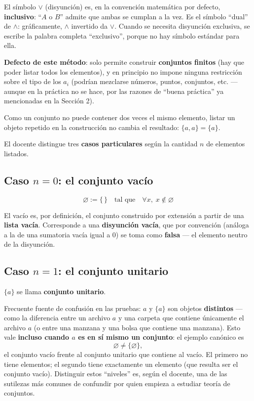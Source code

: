 \documentclass[12pt,a4paper]{article}
\begin{document}
\begin{notebox}
El símbolo $\lor$ (disyunción) es, en la convención matemática por
defecto, \textbf{inclusivo}: ``$A$ o $B$'' admite que ambas se cumplan a
la vez. Es el símbolo ``dual'' de $\wedge$: gráficamente, $\wedge$
invertido da $\lor$. Cuando se necesita disyunción exclusiva, se escribe
la palabra completa ``exclusivo'', porque no hay símbolo estándar para
ella.
\end{notebox}

\textbf{Defecto de este método}: solo permite construir \textbf{conjuntos
finitos} (hay que poder listar todos los elementos), y en principio no
impone ninguna restricción sobre el tipo de los $a_i$ (podrían mezclarse
números, puntos, conjuntos, etc. --- aunque en la práctica no se hace, por
las razones de ``buena práctica'' ya mencionadas en la Sección 2).

Como un conjunto no puede contener dos veces el mismo elemento, listar un
objeto repetido en la construcción no cambia el resultado: $\{a, a\} =
\{a\}$.

El docente distingue tres \textbf{casos particulares} según la cantidad
$n$ de elementos listados.

\subsection{Caso $n=0$: el conjunto vacío}

\begin{keybox}
\[
\boxed{\varnothing := \{\,\} \quad\text{tal que}\quad \forall x,\; x \notin \varnothing}
\]
\end{keybox}

El vacío es, por definición, el conjunto construido por extensión a
partir de una \textbf{lista vacía}. Corresponde a una \textbf{disyunción
vacía}, que por convención (análoga a la de una sumatoria vacía igual a
$0$) se toma como \textbf{falsa} --- el elemento neutro de la disyunción.

\subsection{Caso $n=1$: el conjunto unitario}

$\{a\}$ se llama \textbf{conjunto unitario}.

\begin{warnbox}
Frecuente fuente de confusión en las pruebas: $a$ y $\{a\}$ son objetos
\textbf{distintos} --- como la diferencia entre un archivo $a$ y una
carpeta que contiene únicamente el archivo $a$ (o entre una manzana y una
bolsa que contiene una manzana). Esto vale \textbf{incluso cuando $a$ es
en sí mismo un conjunto}: el ejemplo canónico es
\[
\varnothing \neq \{\varnothing\},
\]
el conjunto vacío frente al conjunto unitario que contiene al vacío. El
primero no tiene elementos; el segundo tiene exactamente un elemento (que
resulta ser el conjunto vacío). Distinguir estos ``niveles'' es, según el
docente, una de las sutilezas más comunes de confundir por quien empieza
a estudiar teoría de conjuntos.
\end{warnbox}
\end{document}
